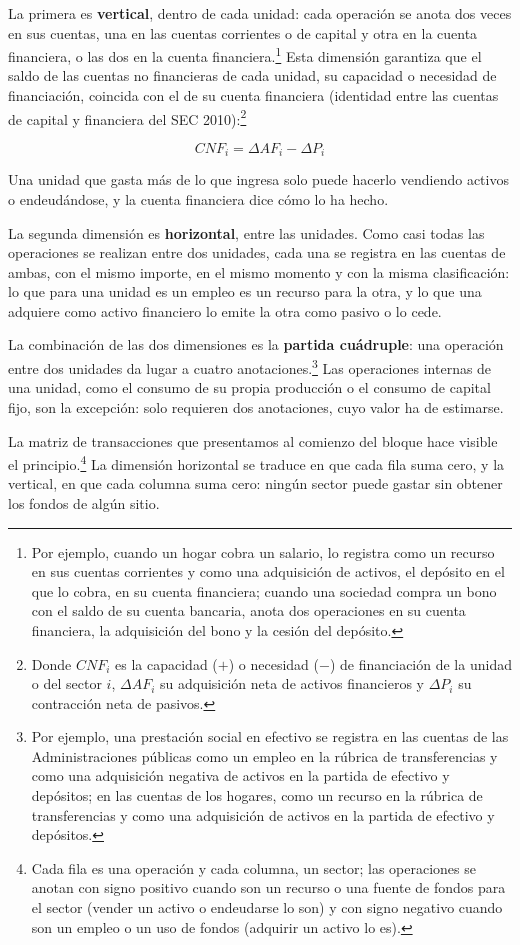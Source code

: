 \documentclass[10pt,a4paper]{article}
\begin{document}
La primera es \textbf{vertical}, dentro de cada unidad: cada operación se anota dos veces en sus cuentas, una en las cuentas corrientes o de capital y otra en la cuenta financiera, o las dos en la cuenta financiera.\footnote{%
  Por ejemplo, cuando un hogar cobra un salario, lo registra como un recurso en sus cuentas corrientes y como una adquisición de activos, el depósito en el que lo cobra, en su cuenta financiera; cuando una sociedad compra un bono con el saldo de su cuenta bancaria, anota dos operaciones en su cuenta financiera, la adquisición del bono y la cesión del depósito.
} Esta dimensión garantiza que el saldo de las cuentas no financieras de cada unidad, su capacidad o necesidad de financiación, coincida con el de su cuenta financiera (identidad entre las cuentas de capital y financiera del SEC 2010):\footnote{%
  Donde $CNF_i$ es la capacidad ($+$) o necesidad ($-$) de financiación de la unidad o del sector $i$, $\Delta AF_i$ su adquisición neta de activos financieros y $\Delta P_i$ su contracción neta de pasivos.
}

$$CNF_i=\Delta AF_i-\Delta P_i$$

Una unidad que gasta más de lo que ingresa solo puede hacerlo vendiendo activos o endeudándose, y la cuenta financiera dice cómo lo ha hecho.

La segunda dimensión es \textbf{horizontal}, entre las unidades. Como casi todas las operaciones se realizan entre dos unidades, cada una se registra en las cuentas de ambas, con el mismo importe, en el mismo momento y con la misma clasificación: lo que para una unidad es un empleo es un recurso para la otra, y lo que una adquiere como activo financiero lo emite la otra como pasivo o lo cede. 

La combinación de las dos dimensiones es la \textbf{partida cuádruple}: una operación entre dos unidades da lugar a cuatro anotaciones.\footnote{%
  Por ejemplo, una prestación social en efectivo se registra en las cuentas de las Administraciones públicas como un empleo en la rúbrica de transferencias y como una adquisición negativa de activos en la partida de efectivo y depósitos; en las cuentas de los hogares, como un recurso en la rúbrica de transferencias y como una adquisición de activos en la partida de efectivo y depósitos.
} Las operaciones internas de una unidad, como el consumo de su propia producción o el consumo de capital fijo, son la excepción: solo requieren dos anotaciones, cuyo valor ha de estimarse.

La matriz de transacciones que presentamos al comienzo del bloque hace visible el principio.\footnote{%
  Cada fila es una operación y cada columna, un sector; las operaciones se anotan con signo positivo cuando son un recurso o una fuente de fondos para el sector (vender un activo o endeudarse lo son) y con signo negativo cuando son un empleo o un uso de fondos (adquirir un activo lo es). 
} La dimensión horizontal se traduce en que cada fila suma cero, y la vertical, en que cada columna suma cero: ningún sector puede gastar sin obtener los fondos de algún sitio.
\end{document}
